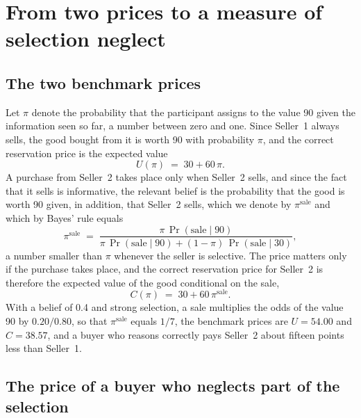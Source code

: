 \documentclass[11pt,a4paper]{article}
\newcommand{\psale}{\pi^{\mathrm{sale}}}
\newcommand{\sale}{\mathrm{sale}}
\begin{document}
\section{From two prices to a measure of selection neglect}\label{sec:measure}

\subsection{The two benchmark prices}

Let $\pi$ denote the probability that the participant assigns to the value 90 given the information seen so far, a number between zero and one. Since Seller~1 always sells, the good bought from it is worth 90 with probability $\pi$, and the correct reservation price is the expected value
\[
U(\pi)\;=\;30+60\,\pi .
\]
A purchase from Seller~2 takes place only when Seller~2 sells, and since the fact that it sells is informative, the relevant belief is the probability that the good is worth 90 given, in addition, that Seller~2 sells, which we denote by $\psale$ and which by Bayes' rule equals
\[
\psale\;=\;\frac{\pi\,\Pr(\sale\mid 90)}{\pi\,\Pr(\sale\mid 90)+(1-\pi)\,\Pr(\sale\mid 30)},
\]
a number smaller than $\pi$ whenever the seller is selective. The price matters only if the purchase takes place, and the correct reservation price for Seller~2 is therefore the expected value of the good conditional on the sale,
\[
C(\pi)\;=\;30+60\,\psale .
\]
With a belief of 0.4 and strong selection, a sale multiplies the odds of the value 90 by $0.20/0.80$, so that $\psale$ equals $1/7$, the benchmark prices are $U=54.00$ and $C=38.57$, and a buyer who reasons correctly pays Seller~2 about fifteen points less than Seller~1.

\subsection{The price of a buyer who neglects part of the selection}
\end{document}
